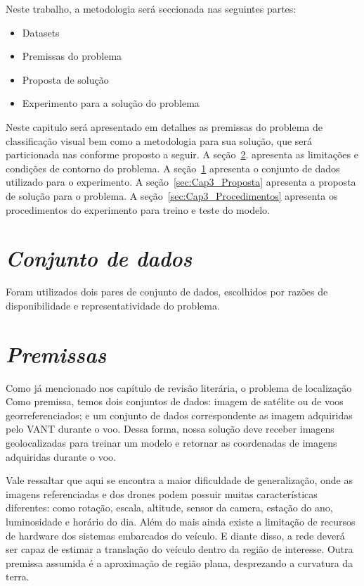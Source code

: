 Neste trabalho, a metodologia será seccionada nas seguintes partes:
\begin{itemize}
    \item  Datasets
    \item  Premissas do problema
    \item  Proposta de solução
    \item  Experimento para a solução do problema

\end{itemize}

Neste capitulo será apresentado em detalhes as premissas do problema de classificação visual bem como a metodologia para sua solução, que será particionada nas conforme proposto a seguir. A seção~\ref{sec:Cap3_Premissas}. apresenta as limitações e condições de contorno do problema. A seção~\ref{sec:Cap3_Dataset} apresenta o conjunto de dados utilizado para o experimento. A seção~\ref{sec:Cap3_Proposta} apresenta a proposta de solução para o problema. A seção~\ref{sec:Cap3_Procedimentos} apresenta os procedimentos do experimento para treino e teste do modelo.


\section{\textit{Conjunto de dados}}\label{sec:Cap3_Dataset}
Foram utilizados dois pares de conjunto de dados, escolhidos por razões de disponibilidade e representatividade do problema. 




\section{\textit{Premissas}}\label{sec:Cap3_Premissas}
Como já mencionado nos capítulo de revisão literária, o problema de localização 
Como premissa, temos dois conjuntos de dados: imagem de satélite ou de voos georreferenciados; e um conjunto de dados correspondente as imagem adquiridas pelo VANT durante o voo. Dessa forma, nossa solução deve receber imagens geolocalizadas para treinar um modelo e retornar as coordenadas de imagens adquiridas durante o voo. 

Vale ressaltar que aqui se encontra a maior dificuldade de generalização, onde as imagens referenciadas e dos drones podem possuir muitas características diferentes: como rotação, escala, altitude, sensor da camera, estação do ano, luminosidade e horário do dia. Além do mais ainda existe a limitação de recursos de hardware dos sistemas embarcados do veículo. E diante disso, a rede deverá ser capaz de estimar a translação do veículo dentro da região de interesse. Outra premissa assumida é a aproximação de região plana, desprezando a curvatura da terra.

